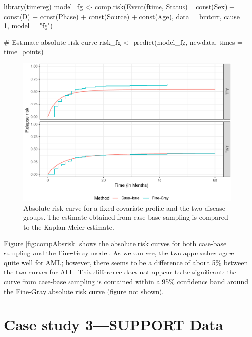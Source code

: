 \begin{Schunk}
\begin{Sinput}
library(timereg)
model_fg <- comp.risk(Event(ftime, Status) ~ const(Sex) + const(D) +
                        const(Phase) + const(Source) + const(Age),
                      data = bmtcrr, cause = 1, model = "fg")

# Estimate absolute risk curve
risk_fg <- predict(model_fg, newdata, times = time_points)
\end{Sinput}
\end{Schunk}

\begin{Schunk}
\begin{figure}[ht]
\includegraphics[width=\textwidth,keepaspectratio=true]{../figures/bmtcrr-risk-1} \caption{\label{fig:compAbsrisk} Absolute risk curve for a fixed covariate profile and the two disease groups. The estimate obtained from case-base sampling is compared to the Kaplan-Meier estimate.}\label{fig:bmtcrr-risk}
\end{figure}
\end{Schunk}

Figure \ref{fig:compAbsrisk} shows the absolute risk curves for both
case-base sampling and the Fine-Gray model. As we can see, the two
approaches agree quite well for AML; however, there seems to be a
difference of about 5\% between the two curves for ALL. This difference
does not appear to be significant: the curve from case-base sampling is
contained within a 95\% confidence band around the Fine-Gray absolute
risk curve (figure not shown).

\hypertarget{case-study-3support-data}{%
\section{Case study 3---SUPPORT Data}\label{case-study-3support-data}}

